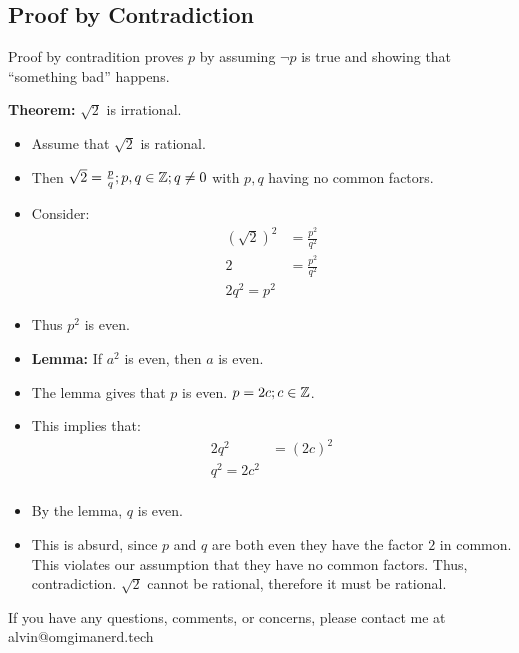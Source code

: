 \documentclass[letterpaper, 12pt]{math}
\begin{document}
\subsection*{Proof by Contradiction}
Proof by contradition proves \( p \) by assuming \( \neg{p} \) is true and
showing that ``something bad'' happens. \par
\textbf{Theorem:} \( \sqrt{2} \) is irrational.
\begin{itemize}
  \item Assume that \( \sqrt{2} \) is rational.
  \item Then \( \sqrt{2} = \frac{p}{q}; p,q \in \mathbb{Z}; q \neq 0 \) with \( p,q \)
    having no common factors.
  \item Consider:
    \begin{align*}
      (\sqrt{2})^{2} &= \frac{p^{2}}{q^{2}} \\
      2 &= \frac{p^{2}}{q^{2}} \\
      2q^{2} = p^{2}
    \end{align*}
  \item Thus \( p^{2} \) is even.
  \item \textbf{Lemma:} If \( a^{2} \) is even, then \( a \) is even.
  \item The lemma gives that \( p \) is even. \( p = 2c; c \in \mathbb{Z} \).
  \item This implies that:
    \begin{align*}
      2q^{2} &= (2c)^{2} \\
      q^{2} = 2c^{2} \\
    \end{align*}
  \item By the lemma, \( q \) is even.
  \item This is absurd, since \( p \) and \( q \) are both even they have
    the factor \( 2 \) in common. This violates our assumption that they
    have no common factors. Thus, contradiction. \( \sqrt{2} \) cannot be
    rational, therefore it must be rational.
\end{itemize}

\begin{center}
  If you have any questions, comments, or concerns, please contact me at
  alvin@omgimanerd.tech
\end{center}
\end{document}
